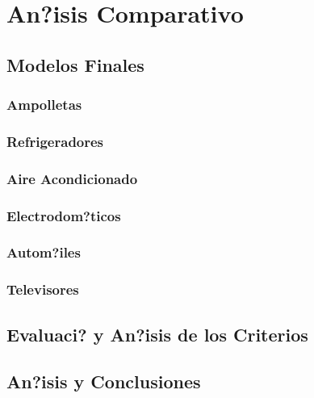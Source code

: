 \chapter{An?isis Comparativo}
\label{ch:implem}

\section{Modelos Finales}
\subsection{Ampolletas}
\subsection{Refrigeradores}
\subsection{Aire Acondicionado}
\subsection{Electrodom?ticos}
\subsection{Autom?iles}
\subsection{Televisores}

\section{Evaluaci? y An?isis de los Criterios}

\section{An?isis y Conclusiones}

